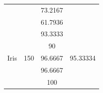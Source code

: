 \documentclass[12pt]{article}
\begin{document}
\begin{table}[]
\begin{tabular}{|c|c|c|c|}
		&                         & 73.2167                                                                                          &                             \\ \cline{3-3}
		&                         & 61.7936                                                                                          &                             \\ \hline
		\multirow{5}{*}{Iris}                & \multirow{5}{*}{150}    & 93.3333                                                                                          & \multirow{5}{*}{95.33334}   \\ \cline{3-3}
		&                         & 90                                                                                               &                             \\ \cline{3-3}
		&                         & 96.6667                                                                                          &                             \\ \cline{3-3}
		&                         & 96.6667                                                                                          &                             \\ \cline{3-3}
		&                         & 100                                                                                              &                             \\ \hline
	\end{tabular}
\end{table}
\end{document}
